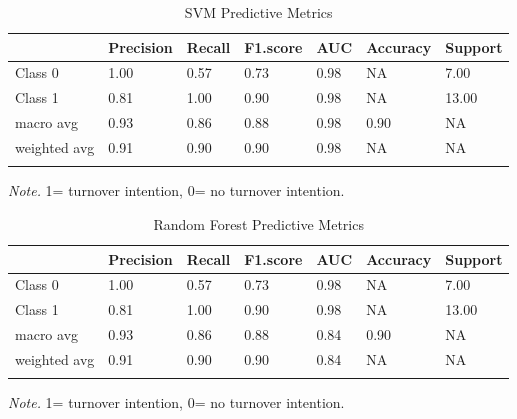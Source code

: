 \documentclass[
  man]{apa7}
\begin{document}
\begin{table}[tbp]

\begin{center}
\begin{threeparttable}

\caption{\label{tab:svm200}SVM Predictive Metrics}

\begin{tabular}{lllllll}
\toprule
 & \multicolumn{1}{c}{Precision} & \multicolumn{1}{c}{Recall} & \multicolumn{1}{c}{F1.score} & \multicolumn{1}{c}{AUC} & \multicolumn{1}{c}{Accuracy} & \multicolumn{1}{c}{Support}\\
\midrule
Class 0 & 1.00 & 0.57 & 0.73 & 0.98 & NA & 7.00\\
Class 1 & 0.81 & 1.00 & 0.90 & 0.98 & NA & 13.00\\
macro avg & 0.93 & 0.86 & 0.88 & 0.98 & 0.90 & NA\\
weighted avg & 0.91 & 0.90 & 0.90 & 0.98 & NA & NA\\
\bottomrule
\addlinespace
\end{tabular}

\begin{tablenotes}[para]
\normalsize{\textit{Note.} 1= turnover intention, 0= no turnover intention.}
\end{tablenotes}

\end{threeparttable}
\end{center}

\end{table}

\begin{table}[tbp]

\begin{center}
\begin{threeparttable}

\caption{\label{tab:rf200}Random Forest Predictive Metrics}

\begin{tabular}{lllllll}
\toprule
 & \multicolumn{1}{c}{Precision} & \multicolumn{1}{c}{Recall} & \multicolumn{1}{c}{F1.score} & \multicolumn{1}{c}{AUC} & \multicolumn{1}{c}{Accuracy} & \multicolumn{1}{c}{Support}\\
\midrule
Class 0 & 1.00 & 0.57 & 0.73 & 0.98 & NA & 7.00\\
Class 1 & 0.81 & 1.00 & 0.90 & 0.98 & NA & 13.00\\
macro avg & 0.93 & 0.86 & 0.88 & 0.84 & 0.90 & NA\\
weighted avg & 0.91 & 0.90 & 0.90 & 0.84 & NA & NA\\
\bottomrule
\addlinespace
\end{tabular}

\begin{tablenotes}[para]
\normalsize{\textit{Note.} 1= turnover intention, 0= no turnover intention.}
\end{tablenotes}

\end{threeparttable}
\end{center}

\end{table}
\end{document}
